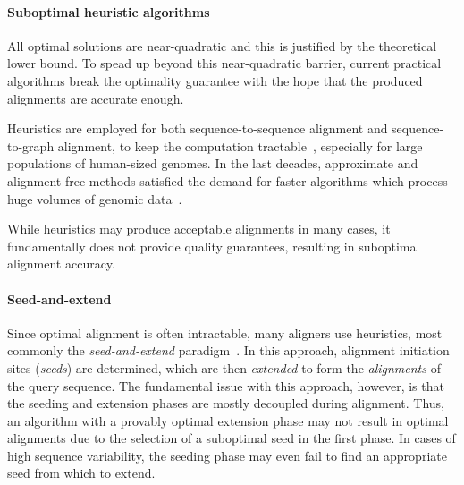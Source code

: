 \paragraph{Suboptimal heuristic algorithms}
All optimal solutions are near-quadratic and this is justified by the
theoretical lower bound. To spead up beyond this near-quadratic barrier, current
practical algorithms break the optimality guarantee with the hope that the
produced alignments are accurate enough. 

Heuristics are employed for both sequence-to-sequence alignment and
sequence-to-graph alignment, to keep the computation
tractable~\cite{altschul_basic_1990,langmead_fast_2012,garrison_variation_2018},
especially for large populations of human-sized genomes. In the last decades,
approximate and alignment-free methods satisfied the demand for faster
algorithms which process huge volumes of genomic
data~\citep{kucherov2019evolution}. 

While heuristics may produce acceptable alignments in many cases, it
fundamentally does not provide quality guarantees, resulting in suboptimal
alignment accuracy.

\paragraph{Seed-and-extend}
Since optimal alignment is often intractable, many aligners use heuristics, most
commonly the \emph{seed-and-extend}
paradigm~\cite{altschul_basic_1990,langmead_fast_2012,li_fast_2009}. In this
approach, alignment initiation sites (\emph{seeds}) are determined, which are
then \emph{extended} to form the \emph{alignments} of the query sequence. The
fundamental issue with this approach, however, is that the seeding and extension
phases are mostly decoupled during alignment. Thus, an algorithm with a provably
optimal extension phase may not result in optimal alignments due to the
selection of a suboptimal seed in the first phase. In cases of high sequence
variability, the seeding phase may even fail to find an appropriate seed from
which to extend.


